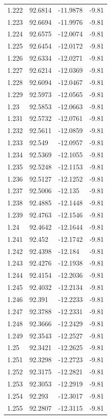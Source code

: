 \begin{tabular}{llll}
1.222 & 92.6814 & -11.9878 & -9.81 \\
1.223 & 92.6694 & -11.9976 & -9.81 \\
1.224 & 92.6575 & -12.0074 & -9.81 \\
1.225 & 92.6454 & -12.0172 & -9.81 \\
1.226 & 92.6334 & -12.0271 & -9.81 \\
1.227 & 92.6214 & -12.0369 & -9.81 \\
1.228 & 92.6094 & -12.0467 & -9.81 \\
1.229 & 92.5973 & -12.0565 & -9.81 \\
1.23 & 92.5853 & -12.0663 & -9.81 \\
1.231 & 92.5732 & -12.0761 & -9.81 \\
1.232 & 92.5611 & -12.0859 & -9.81 \\
1.233 & 92.549 & -12.0957 & -9.81 \\
1.234 & 92.5369 & -12.1055 & -9.81 \\
1.235 & 92.5248 & -12.1153 & -9.81 \\
1.236 & 92.5127 & -12.1252 & -9.81 \\
1.237 & 92.5006 & -12.135 & -9.81 \\
1.238 & 92.4885 & -12.1448 & -9.81 \\
1.239 & 92.4763 & -12.1546 & -9.81 \\
1.24 & 92.4642 & -12.1644 & -9.81 \\
1.241 & 92.452 & -12.1742 & -9.81 \\
1.242 & 92.4398 & -12.184 & -9.81 \\
1.243 & 92.4276 & -12.1938 & -9.81 \\
1.244 & 92.4154 & -12.2036 & -9.81 \\
1.245 & 92.4032 & -12.2134 & -9.81 \\
1.246 & 92.391 & -12.2233 & -9.81 \\
1.247 & 92.3788 & -12.2331 & -9.81 \\
1.248 & 92.3666 & -12.2429 & -9.81 \\
1.249 & 92.3543 & -12.2527 & -9.81 \\
1.25 & 92.3421 & -12.2625 & -9.81 \\
1.251 & 92.3298 & -12.2723 & -9.81 \\
1.252 & 92.3175 & -12.2821 & -9.81 \\
1.253 & 92.3053 & -12.2919 & -9.81 \\
1.254 & 92.293 & -12.3017 & -9.81 \\
1.255 & 92.2807 & -12.3115 & -9.81 \\

\end{tabular}
